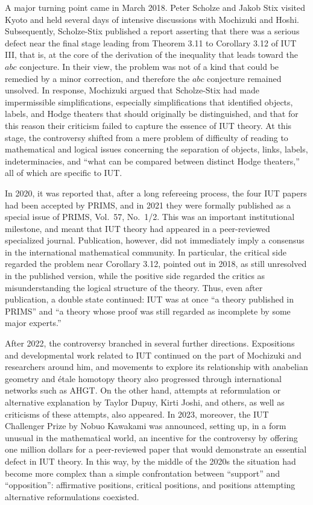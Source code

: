 \documentclass[12pt, reqno, a4paper]{amsart}
\begin{document}
A major turning point came in March 2018. Peter Scholze and Jakob Stix visited Kyoto and held several days of intensive discussions with Mochizuki and Hoshi. Subsequently, Scholze-Stix published a report asserting that there was a serious defect near the final stage leading from Theorem 3.11 to Corollary 3.12 of IUT III, that is, at the core of the derivation of the inequality that leads toward the $abc$ conjecture. In their view, the problem was not of a kind that could be remedied by a minor correction, and therefore the $abc$ conjecture remained unsolved. In response, Mochizuki argued that Scholze-Stix had made impermissible simplifications, especially simplifications that identified objects, labels, and Hodge theaters that should originally be distinguished, and that for this reason their criticism failed to capture the essence of IUT theory. At this stage, the controversy shifted from a mere problem of difficulty of reading to mathematical and logical issues concerning the separation of objects, links, labels, indeterminacies, and ``what can be compared between distinct Hodge theaters,'' all of which are specific to IUT.

In 2020, it was reported that, after a long refereeing process, the four IUT papers had been accepted by PRIMS, and in 2021 they were formally published as a special issue of PRIMS, Vol.\ 57, No.\ 1/2. This was an important institutional milestone, and meant that IUT theory had appeared in a peer-reviewed specialized journal. Publication, however, did not immediately imply a consensus in the international mathematical community. In particular, the critical side regarded the problem near Corollary 3.12, pointed out in 2018, as still unresolved in the published version, while the positive side regarded the critics as misunderstanding the logical structure of the theory. Thus, even after publication, a double state continued: IUT was at once ``a theory published in PRIMS'' and ``a theory whose proof was still regarded as incomplete by some major experts.''

After 2022, the controversy branched in several further directions. Expositions and developmental work related to IUT continued on the part of Mochizuki and researchers around him, and movements to explore its relationship with anabelian geometry and \'etale homotopy theory also progressed through international networks such as AHGT. On the other hand, attempts at reformulation or alternative explanation by Taylor Dupuy, Kirti Joshi, and others, as well as criticisms of these attempts, also appeared. In 2023, moreover, the IUT Challenger Prize by Nobuo Kawakami was announced, setting up, in a form unusual in the mathematical world, an incentive for the controversy by offering one million dollars for a peer-reviewed paper that would demonstrate an essential defect in IUT theory. In this way, by the middle of the 2020s the situation had become more complex than a simple confrontation between ``support'' and ``opposition'': affirmative positions, critical positions, and positions attempting alternative reformulations coexisted.
\end{document}
